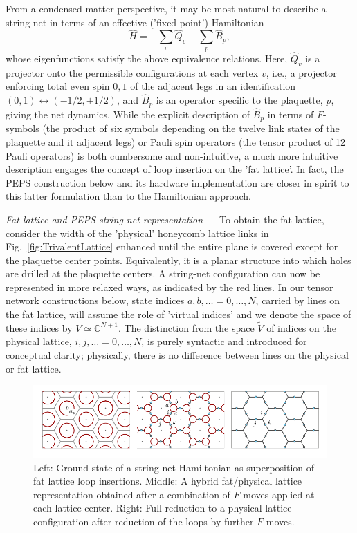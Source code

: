 \documentclass[twocolumn,floats,prx,showpacs]{revtex4-1}
\begin{document}
From a condensed matter perspective, it may be most natural to describe a string-net in terms of an effective ('fixed point') Hamiltonian 
\begin{equation}
\hat H =-\sum_v \hat Q_v - \sum_p \hat B_p, 
\end{equation}
whose eigenfunctions satisfy the above equivalence relations. Here, $\hat Q_v$ is a projector onto the permissible configurations at each vertex $v$, i.e., a projector enforcing total even spin $0,1$ of the adjacent legs in an identification $(0,1)\leftrightarrow (-1/2,+1/2)$, and $\hat B_p$ is an operator specific to the plaquette, $p$, giving the net dynamics. While the explicit description of $\hat B_p$ in terms of $F$-symbols (the product of six symbols depending on the twelve link states of the plaquette and it adjacent legs) or Pauli spin operators (the tensor product of 12 Pauli operators) is both cumbersome and non-intuitive, a much more intuitive description engages the concept of loop insertion on the 'fat lattice'. In fact, the PEPS construction below and its hardware implementation are closer in spirit to this latter formulation than to the Hamiltonian approach.

\emph{Fat lattice and PEPS string-net representation ---} To obtain the fat lattice, consider the width of the 'physical' honeycomb lattice links in Fig.~\ref{fig:TrivalentLattice} enhanced until the entire plane is covered except for the plaquette center points. Equivalently, it is a planar structure into which holes are drilled at the plaquette centers. A string-net configuration can now be represented in more relaxed ways, as indicated by the red lines. In our tensor network constructions below, state indices $a,b,\dots =0,\dots, N$, carried by lines on the fat lattice, will assume the role of 'virtual indices' and we denote the  space of these indices by $V\simeq \mathbb{C}^{N+1}$. The distinction from the space $\tilde V$ of indices on the physical lattice, $i,j,\dots =0,\dots,N$, is purely syntactic and introduced for conceptual clarity; physically, there is no difference between lines on the physical or fat lattice. 

\begin{figure}
\includegraphics[width=14cm]{fig/PEPSGroundState.pdf}
\caption{Left: Ground state of a string-net Hamiltonian as superposition of fat lattice loop insertions. Middle: A hybrid fat/physical lattice representation obtained after a combination of $F$-moves applied at each lattice center. Right: Full reduction to a physical lattice configuration after reduction of the loops by further $F$-moves.}
\label{fig:PEPSGroundState}
\end{figure}
\end{document}
